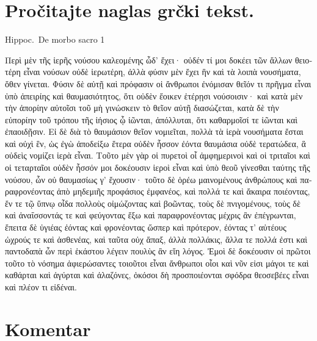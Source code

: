 
\section*{Pročitajte naglas grčki tekst.}

Hippoc.\ De morbo sacro 1


\medskip


{\large

\begin{greek}

\noindent Περὶ μὲν τῆς ἱερῆς νούσου καλεομένης ὧδ’ ἔχει· οὐδέν τί μοι δοκέει τῶν ἄλλων θειοτέρη εἶναι νούσων οὐδὲ ἱερωτέρη, ἀλλὰ φύσιν μὲν ἔχει ἣν καὶ τὰ λοιπὰ νουσήματα, ὅθεν γίνεται. Φύσιν δὲ αὐτῇ καὶ πρόφασιν οἱ ἄνθρωποι ἐνόμισαν θεῖόν τι πρῆγμα εἶναι ὑπὸ ἀπειρίης καὶ θαυμασιότητος, ὅτι οὐδὲν ἔοικεν ἑτέρῃσι νούσοισιν· καὶ κατὰ μὲν τὴν ἀπορίην αὐτοῖσι τοῦ μὴ γινώσκειν τὸ θεῖον αὐτῇ διασώζεται, κατὰ δὲ τὴν εὐπορίην τοῦ τρόπου τῆς ἰήσιος ᾧ ἰῶνται, ἀπόλλυται, ὅτι καθαρμοῖσί τε ἰῶνται καὶ ἐπαοιδῇσιν. Εἰ δὲ διὰ τὸ θαυμάσιον θεῖον νομιεῖται, πολλὰ τὰ ἱερὰ νουσήματα ἔσται καὶ οὐχὶ ἓν, ὡς ἐγὼ ἀποδείξω ἕτερα οὐδὲν ἧσσον ἐόντα θαυμάσια οὐδὲ τερατώδεα, ἃ οὐδεὶς νομίζει ἱερὰ εἶναι. Τοῦτο μὲν γὰρ οἱ πυρετοὶ οἷ ἀμφημερινοὶ καὶ οἱ τριταῖοι καὶ οἱ τεταρταῖοι οὐδὲν ἧσσόν μοι δοκέουσιν ἱεροὶ εἶναι καὶ ὑπὸ θεοῦ γίνεσθαι ταύτης τῆς νούσου, ὧν οὐ θαυμασίως γ’ ἔχουσιν· τοῦτο δὲ ὁρέω μαινομένους ἀνθρώπους καὶ παραφρονέοντας ἀπὸ μηδεμιῆς προφάσιος ἐμφανέος, καὶ πολλά τε καὶ ἄκαιρα ποιέοντας, ἔν τε τῷ ὕπνῳ οἶδα πολλοὺς οἰμώζοντας καὶ βοῶντας, τοὺς δὲ πνιγομένους, τοὺς δὲ καὶ ἀναΐσσοντάς τε καὶ φεύγοντας ἔξω καὶ παραφρονέοντας μέχρις ἂν ἐπέγρωνται, ἔπειτα δὲ ὑγιέας ἐόντας καὶ φρονέοντας ὥσπερ καὶ πρότερον, ἐόντας τ’ αὐτέους ὠχρούς τε καὶ ἀσθενέας, καὶ ταῦτα οὐχ ἅπαξ, ἀλλὰ πολλάκις, ἄλλα τε πολλά ἐστι καὶ παντοδαπὰ ὧν περὶ ἑκάστου λέγειν πουλὺς ἂν εἴη λόγος. Ἐμοὶ δὲ δοκέουσιν οἱ πρῶτοι τοῦτο τὸ νόσημα ἀφιερώσαντες τοιοῦτοι εἶναι ἄνθρωποι οἷοι καὶ νῦν εἰσι μάγοι τε καὶ καθάρται καὶ ἀγύρται καὶ ἀλαζόνες, ὁκόσοι δὴ προσποιέονται σφόδρα θεοσεβέες εἶναι καὶ πλέον τι εἰδέναι.

\end{greek}

}


\section*{Komentar}



